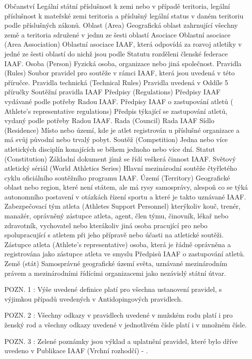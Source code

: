 \dend
\dt Občanství
\dd Legální státní příslušnost k zemi nebo v případě teritoria, legální příslušnost k mateřské zemi teritoria a příslušný legální status v daném teritoriu podle příslušných zákonů.
\dend
\dt Oblast (Area)
\dd Geografická oblast zahrnující všechny země a teritoria sdružené v jednu ze šesti oblastí Asociace
\dend
\dt Oblastní asociace (Area Association)
\dd Oblastní asociace IAAF, která odpovídá za rozvoj atletiky v jedné ze šesti oblastí do nichž jsou podle Statutu rozděleni členské federace IAAF.
\dend
\dt Osoba (Person)
\dd Fyzická osoba, organizace nebo jiná společnost.
\dend
\dt Pravidla (Rules)
\dd Soubor pravidel pro soutěže v rámci IAAF, která jsou uvedená v této příručce.
\dend
\dt Pravidla technická (Technical Rules)
\dd Pravidla uvedená v Oddíle 5 příručky Soutěžní pravidla IAAF
\dend
\dt Předpisy (Regulations)
\dd Předpisy IAAF vydávané podle potřeby Radou IAAF.
\dend
\dt Předpisy IAAF o zastupování atletů ( Athlete's representative regulations)
\dd Předpis týkající se zastupování atletů, vydaný podle potřeby Radou IAAF.
\dend
\dt Rada (Council)
\dd Rada IAAF
\dend
\dt Sídlo (Residence)
\dd Místo nebo území, kde je atlet registrován u příslušné organizace a má svůj původní nebo trvalý pobyt.
\dend
\dt Soutěž (Competition)
\dd Jedna nebo více atletických disciplín konajících se během jednoho nebo více dní.
\dend
\dt Statut (Constitution)
\dd Základní dokument jímž se řídí veškerá činnost IAAF.
\dend
\dt Světový atletický sériál (World Athletics Series)
\dd Hlavní mezinárodní soutěže čtyřletého cyklu oficiálního soutěžního programu IAAF.
\dend
\dt Území (Territory)
\dd Geografické oblast nebo region, které není státem, ale má rysy samosprávy, alespoň co se týká autonomního postavení v otázkách řízení sportu a které je takto uznávané IAAF.
\dend
\dt Zabezpečovací tým atleta (Athletes Support Personnel)
\dd kterýkoliv kouč, trenér, manažér, oprávněný zástupce atleta, agent, člen týmu, činovník, lékař nebo zdravotník, vychovatel nebo kterákoliv jiná osoba pracující pro nebo spolupracující s atletem při jeho přípravě nebo účasti na atletické soutěži.
\dend
\dt Zástupce atleta (Athlete's representative)
\dd osoba, která je řádně oprávněna a registrována jako zástupce atleta ve smyslu Předpisů IAAF o zastupování atletů.
\dend
\dt Země (stát)
\dd Samosprávné geografické území světa, uznávané mezinárodním právem a mezinárodními řídícími organizacemi jako nezávislý státní útvar.
\dend

POZN. 1 : Výše uvedené definice platí pro všechna ustanovení pravidel, s výjimkou případů uvedených v Antidopingových pravidlech.

POZN. 2 : Všechny odkazy v pravidlech uvedené v mužském rodu platí i pro ženský rod a všechny odkazy uvedené v jednotlivém čísle platí i v množném čísle.

POZN. 3 : Zelené poznámky jsou výklad a uplatnění pravidel, které bylo dříve uvedeno v Publikace IAAF  (Vrchní rozhodčí) - .





\bye